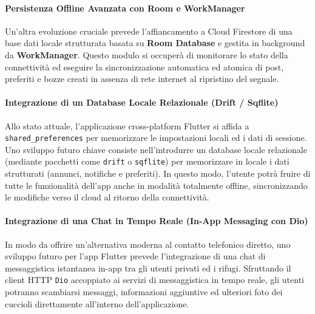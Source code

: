 \documentclass[a4paper]{report}
\begin{document}
\paragraph{Persistenza Offline Avanzata con Room e WorkManager}
Un'altra evoluzione cruciale prevede l'affiancamento a Cloud Firestore di una base dati locale strutturata basata su \textbf{Room Database} e gestita in background da \textbf{WorkManager}. Questo modulo si occuperà di monitorare lo stato della connettività ed eseguire la sincronizzazione automatica ed atomica di post, preferiti e bozze creati in assenza di rete internet al ripristino del segnale.
\paragraph{Integrazione di un Database Locale Relazionale (Drift / Sqflite)}
Allo stato attuale, l’applicazione cross-platform Flutter si affida a \texttt{shared\_preferences} per memorizzare le impostazioni locali ed i dati di sessione. Uno sviluppo futuro chiave consiste nell’introdurre un database locale relazionale (mediante pacchetti come \texttt{drift} o \texttt{sqflite}) per memorizzare in locale i dati strutturati (annunci, notifiche e preferiti). In questo modo, l'utente potrà fruire di tutte le funzionalità dell'app anche in modalità totalmente offline, sincronizzando le modifiche verso il cloud al ritorno della connettività.
\paragraph{Integrazione di una Chat in Tempo Reale (In-App Messaging con Dio)}
In modo da offrire un'alternativa moderna al contatto telefonico diretto, uno sviluppo futuro per l'app Flutter prevede l'integrazione di una chat di messaggistica istantanea in-app tra gli utenti privati ed i rifugi. Sfruttando il client HTTP \texttt{Dio} accoppiato ai servizi di messaggistica in tempo reale, gli utenti potranno scambiarsi messaggi, informazioni aggiuntive ed ulteriori foto dei cuccioli direttamente all'interno dell'applicazione.
\end{document}
